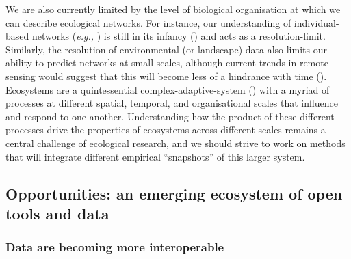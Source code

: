 \begin{refsection}
We are also currently limited by the level of biological organisation at
which we can describe ecological networks. For instance, our
understanding of individual-based networks (\emph{e.g.,} \cite{Araujo2008NetAna,
Tinker2012StrMec}) is still in its infancy (\cite{Guimaraes2020StrEco})
and acts as a resolution-limit. Similarly, the resolution of
environmental (or landscape) data also limits our ability to predict
networks at small scales, although current trends in remote sensing
would suggest that this will become less of a hindrance with time
(\cite{Makiola2020KeyQue}). Ecosystems are a quintessential
complex-adaptive-system (\cite{Levin1998EcoBio}) with a myriad of
processes at different spatial, temporal, and organisational scales that
influence and respond to one another. Understanding how the product of
these different processes drive the properties of ecosystems across
different scales remains a central challenge of ecological research, and
we should strive to work on methods that will integrate different
empirical ``snapshots'' of this larger system.

\subsection{Opportunities: an emerging ecosystem of open tools and
data}\label{opportunities-an-emerging-ecosystem-of-open-tools-and-data}

\subsubsection{Data are becoming more
interoperable}\label{data-are-becoming-more-interoperable}


\end{refsection}
